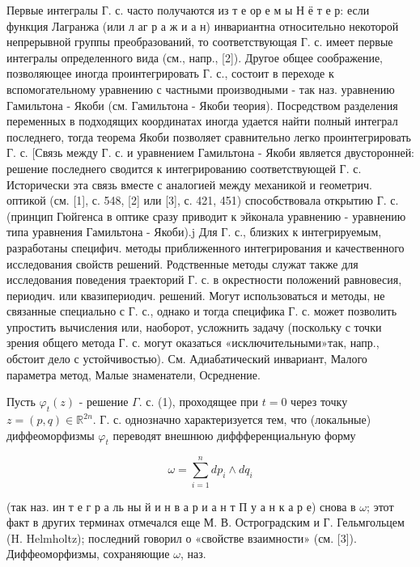 \documentclass[10pt]{article}
\begin{document}
Первые интегралы $Г$. с. часто получаются из т е ор е м ы Н ё т е р: если функция Лагранжа (или л аг р а ж и а н) инвариантна относительно некоторой непрерывной группы преобразований, то соответствующая Г. с. имеет первые интегралы определенного вида (см., напр., [2]). Другое общее соображение, позволяющее иногда проинтегрировать $Г$. с., состоит в переходе к вспомогательному уравнению с частными производными - так наз. уравнению Гамильтона - Якоби (см. Гамильтона - Якоби теория). Посредством разделения переменных в подходящих координатах иногда удается найти полный интеграл последнего, тогда теорема Якоби позволяет сравнительно легко проинтегрировать Г. с. [Связь между Г. с. и уравнением Гамильтона - Якоби является двусторонней: решение последнего сводится к интегрированию соответствующей Г. с. Исторически эта связь вместе с аналогией между механикой и геометрич. оптикой (см. [1], с. 548, [2] или [3], с. 421, 451) способствовала открытию Г. с. (принцип Гюйгенса в оптике сразу приводит к эйконала уравнению - уравнению типа уравнения Гамильтона - Якоби).j Для Г. с., близких к интегрируемым, разработаны специфич. методы приближенного интегрирования и качественного исследования свойств решений. Родственные методы служат также для исследования поведения траекторий Г. с. в окрестности положений равновесия, периодич. или квазипериодич. решений. Могут использоваться и методы, не связанные специально с Г. с., однако и тогда специфика Г. с. может позволить упростить вычисления или, наоборот, усложнить задачу (поскольку с точки зрения общего метода Г. с. могут оказаться «исключительными»так, напр., обстоит дело с устойчивостью). См. Адиабатический инвариант, Малого параметра метод, Малые знаменатели, Осреднение.



Пусть $\varphi_{t}(z)$ - решение $\Gamma$. с. (1), проходящее при $t=0$ через точку $z=(p, q) \in \mathbb{R}^{2 n}$. Г. с. однозначно характеризуется тем, что (локальные) диффеоморфизмы $\varphi_{t}$ переводят внешнюю диффференциальную форму



\[

\omega=\sum_{i=1}^{n} d p_{i} \wedge d q_{i}

\]



(так наз. ин т е г р а ль ны й и н в а р и а н т П у а н к а р е) снова в $\omega$; этот факт в других терминах отмечался еще М. В. Остроградским и Г. Гельмгольцем (H. Helmholtz); последний говорил о «свойстве взаимности» (см. [3]). Диффеоморфизмы, сохраняющие $\omega$, наз.
\end{document}
